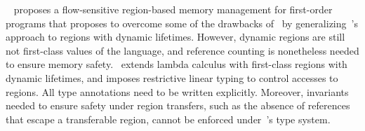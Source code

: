 ~\cite{HMN01} proposes a flow-sensitive region-based memory management
for first-order programs that proposes to overcome some of the
drawbacks of~\cite{tofte97} by generalizing~\cite{tofte97}'s approach
to regions with dynamic lifetimes. However, dynamic regions are still
not first-class values of the language, and reference counting is
nonetheless needed to ensure memory safety.~\cite{WW01} extends lambda
calculus with first-class regions with dynamic lifetimes, and imposes
restrictive linear typing to control accesses to regions. All type
annotations need to be written explicitly. Moreover, invariants needed
to ensure safety under region transfers, such as the absence of
references that escape a transferable region, cannot be enforced
under~\cite{WW01}'s type system.
